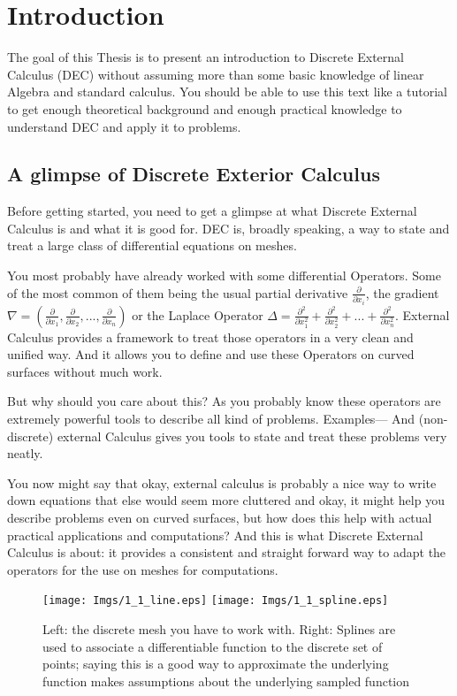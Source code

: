 \chapter{Introduction}

The goal of this Thesis is to present an introduction to Discrete External Calculus (DEC) without assuming more than some basic knowledge of linear Algebra and standard calculus. You should be able to use this text like a tutorial to get enough theoretical background and enough practical knowledge to understand DEC and apply it to problems.

\section{A glimpse of Discrete Exterior Calculus}
Before getting started, you need to get a glimpse at what Discrete External Calculus is and what it is good for. DEC is, broadly speaking, a way to state and treat a large class of differential equations on meshes. 

You most probably have already worked with some differential Operators. Some of the most common of them being the usual partial derivative $\frac{\partial}{\partial x_i}$, the gradient $\nabla = (\frac{\partial}{\partial x_1},\frac{\partial}{\partial x_2},...,\frac{\partial}{\partial x_n})$ or the Laplace Operator $\Delta = \frac{\partial^2}{\partial x_1^2} + \frac{\partial^2}{\partial x_2^2} +... + \frac{\partial^2}{\partial x_n^2}$. External Calculus provides a framework to treat those operators in a very clean and unified way. And it allows you to define and use these Operators on curved surfaces without much work.

But why should you care about this? As you probably know these operators are extremely powerful tools to describe all kind of problems. Examples---
And (non-discrete) external Calculus gives you tools to state and treat these problems very neatly.

You now might say that okay, external calculus is probably a nice way to write down equations that else would seem more cluttered and okay, it might help you describe problems even on curved surfaces, but how does this help with actual practical applications and computations? And this is what Discrete External Calculus is about: it provides a consistent and straight forward way to adapt the operators for the use on meshes for computations. 

\begin{figure}[bht]
\begin{center}
\texttt{[image: Imgs/1\_1\_line.eps]}
\texttt{[image: Imgs/1\_1\_spline.eps]}
\end{center}
\caption{Left: the discrete mesh you have to work with. Right: Splines are used to associate a differentiable function to the discrete set of points; saying this is a good way to approximate the underlying function makes assumptions about the underlying sampled function}
\label{fig::1_1_linevsspline}
\end{figure}


